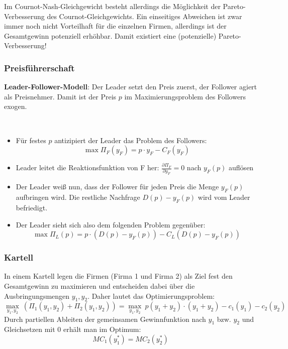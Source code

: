 Im Cournot-Nash-Gleichgewicht besteht allerdings die Möglichkeit der Pareto-Verbesserung des Cournot-Gleichgewichts. Ein einseitiges Abweichen ist zwar immer noch nicht Vorteilhaft für die einzelnen Firmen, allerdings ist der Gesamtgewinn potenziell erhöhbar. Damit existiert eine (potenzielle) Pareto-Verbesserung!

\subsubsection*{Preisführerschaft} %

\textbf{Leader-Follower-Modell}: Der Leader setzt den Preis zuerst, der Follower agiert als Preisnehmer. Damit ist der Preis $p$ im Maximierungsproblem des Followers exogen.

\begin{kr}[Preisführerschaft] ~\
	\begin{itemize}
		\item Für festes $p$ antizipiert der Leader das Problem des Followers:
			$$ \max \Pi_F(y_F) = p \cdot y_F - C_F(y_F) $$	
		\item Leader leitet die Reaktionsfunktion von F her: $\frac{\partial \Pi_F}{\partial y_F} = 0$ nach $y_F(p)$ auflösen
		\item Der Leader weiß nun, dass der Follower für jeden Preis die Menge $y_F(p)$ aufbringen wird. Die restliche Nachfrage $D(p) - y_F(p)$ wird vom Leader befriedigt.
		\item Der Leader sieht sich also dem folgenden Problem gegenüber:
			$$ \max \Pi_L(p) = p \cdot \left( D(p) - y_F(p) \right) - C_L \left(D(p) - y_F(p) \right) $$
	\end{itemize}
\end{kr}


\subsubsection*{Kartell}

In einem Kartell legen die Firmen (Firma 1 und Firma 2) als Ziel fest den Gesamtgewinn zu maximieren und entscheiden dabei über die Ausbringungsmengen $y_1, y_2$. Daher lautet das Optimierungsproblem: 
	$$ \max_{y_1, y_2} ~ \left( \Pi_1(y_1, y_2) + \Pi_2(y_1, y_2) \right) = \max_{y_1, y_2} ~ p \left( y_1 + y_2 \right) \cdot \left( y_1 + y_2 \right) - c_1(y_1) - c_2(y_2) $$
Durch partiellen Ableiten der gemeinsamen Gewinnfunktion nach $y_1$ bzw. $y_2$ und Gleichsetzen mit $0$ erhält man im Optimum:
	$$ MC_1(y_1^*) = MC_2(y_2^*) $$	

